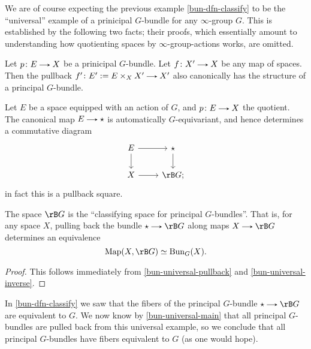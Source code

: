 \begin{nothing}
  \label{bun-universal}
  We are of course expecting the previous example \cref{bun-dfn-classify} to be the ``universal'' example of a prinicipal $G$-bundle for any $\infty$-group $G$. This is established by the following two facts; their proofs, which essentially amount to understanding how quotienting spaces by $\infty$-group-actions works, are omitted.
  
  \begin{sublemma}
    \label{bun-universal-pullback}
    Let $p \c E \to X$ be a prinicipal $G$-bundle. Let $f \c X' \to X$ be any map of spaces. Then the pullback $f' \c E' \ce E \times_X X' \to X'$ also canonically has the structure of a principal $G$-bundle.
  \end{sublemma}
  
  \begin{sublemma}
    \label{bun-universal-inverse}
    Let $E$ be a space equipped with an action of $G$, and $p \c E \to X$ the quotient. The canonical map $E \to \pt$ is automatically $G$-equivariant, and hence determines a commutative diagram
    \[
      \begin{tikzcd}
        E \ar[r] \ar[d] &
        \pt \ar[d] \\
        X \ar[r] &
        \rB G;
      \end{tikzcd}
    \]
    in fact this is a pullback square.
  \end{sublemma}

  \begin{subproposition}
    \label{bun-universal-main}
    The space $\rB G$ is the ``classifying space for principal $G$-bundles''. That is, for any space $X$, pulling back the bundle $\pt \to \rB G$ along maps $X \to \rB G$ determines an equivalence
    \[
      \Map(X, \rB G) \iso \Bun_G(X).
    \]

    \begin{proof}
      This follows immediately from \cref{bun-universal-pullback} and \cref{bun-universal-inverse}.
    \end{proof}
  \end{subproposition}

  \begin{subremark}
    \label{bun-universal-fibration}
    In \cref{bun-dfn-classify} we saw that the fibers of the principal $G$-bundle $\pt \to \rB G$ are equivalent to $G$. We now know by \cref{bun-universal-main} that all principal $G$-bundles are pulled back from this universal example, so we conclude that all principal $G$-bundles have fibers equivalent to $G$ (as one would hope).


\end{subremark}
\end{nothing}
